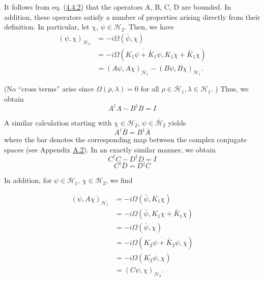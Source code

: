 \documentclass[11pt,a4paper]{article}
\begin{document}
It follows from eq. (\hyperref[eq:4.4.2]{4.4.2}) that the operators A, B, C, D are bounded. In addition, these operators satisfy a number of properties arising directly from their definition. In particular, let \(\chi\), \(\psi \in \mathcal{H}_2\). Then, we have
\begin{equation*}
\begin{aligned}
(\psi,\chi)_{\mathcal{H}_2}
 &=-i\Omega(\bar\psi,\chi)\\
 &=-i\Omega(\overline{K_1\psi+\bar K_1\psi}, K_1\chi+\bar K_1\chi)\\
 &=(A\psi,A\chi)_{\mathcal{H}_1}-(B\psi,B\chi)_{\overline{\mathcal{H}}_1}.
\end{aligned} \tag{4.4.5}\label{eq:4.4.5}
\end{equation*}

(No ``cross terms'' arise since \(\Omega(\overline{\rho},\lambda)=0\) for all \(\rho\in\overline{\mathcal{H}}_1, \lambda\in\mathcal{H}_1.\) ) Thus, we obtain
\begin{equation*}
A^{\dagger}A - B^{\dagger}B = I \tag{4.4.6}\label{eq:4.4.6}
\end{equation*}

A similar calculation starting with \(\chi \in \mathcal{H}_2\), \(\psi \in \overline{\mathcal{H}}_2\) yields
\begin{equation*}
A^{\dagger} \overline{B} = B^{\dagger} \overline{A} \tag{4.4.7}\label{eq:4.4.7}
\end{equation*}
where the bar denotes the corresponding map between the complex conjugate spaces (see Appendix \hyperlink{sec:A.2}{A.2}). In an exactly similar manner, we obtain
\begin{equation*}
C^{\dagger}C - D^{\dagger}D = I \tag{4.4.8}\label{eq:4.4.8}
\end{equation*}
\begin{equation*}
C^{\dagger}\overline{D} = D^{\dagger}\overline{C} \tag{4.4.9}\label{eq:4.4.9}
\end{equation*}

In addition, for \(\psi \in \mathcal{H}_1\), \(\chi \in \mathcal{H}_2\), we find

\hypertarget{source-82}{}
\begin{equation*}
\begin{aligned}
(\psi,A\chi)_{\mathcal{H}_1}
 &=-i\Omega(\bar\psi,K_1\chi)\\
 &=-i\Omega(\bar\psi,K_1\chi+\bar K_1\chi)\\
 &=-i\Omega(\bar\psi,\chi)\\
 &=-i\Omega(\overline{K_2\psi+\bar K_2\psi},\chi)\\
 &=-i\Omega(\overline{K_2\psi},\chi)\\
 &=(C\psi,\chi)_{\mathcal{H}_2}.
\end{aligned} \tag{4.4.10}\label{eq:4.4.10}
\end{equation*}
\end{document}
